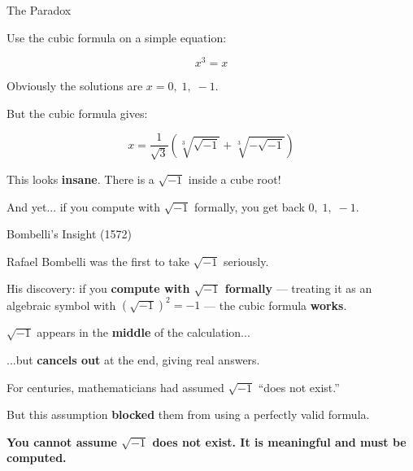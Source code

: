 \documentclass[10pt]{beamer}
\theoremstyle{definition}
\newcommand{\x}[1]{\alert{\textbf{#1}}}
\begin{document}
\begin{frame}{The Paradox}

Use the cubic formula on a simple equation:

$$x^3 = x$$

\vfill

Obviously the solutions are $x = 0, \; 1, \; -1$.

\vfill\pause

But the cubic formula gives:

$$x = \frac{1}{\sqrt{3}}\left(\sqrt[3]{\sqrt{-1}} + \sqrt[3]{-\sqrt{-1}}\right)$$

\vfill\pause

This looks \x{insane}. There is a $\sqrt{-1}$ inside a cube root!

\vfill

And yet... if you compute with $\sqrt{-1}$ formally, you get back $0, \; 1, \; -1$.

\end{frame}


\begin{frame}{Bombelli's Insight (1572)}

Rafael Bombelli was the first to take $\sqrt{-1}$ seriously.

\vfill

His discovery: if you \x{compute with $\sqrt{-1}$ formally} --- treating it as an algebraic symbol with $(\sqrt{-1})^2 = -1$ --- the cubic formula \x{works}.

\vfill\pause

$\sqrt{-1}$ appears in the \x{middle} of the calculation...

\vfill

...but \x{cancels out} at the end, giving real answers.

\vfill\pause

For centuries, mathematicians had assumed $\sqrt{-1}$ ``does not exist.''

\vfill

But this assumption \x{blocked} them from using a perfectly valid formula.

\vfill

\x{You cannot assume $\sqrt{-1}$ does not exist. It is meaningful and must be computed.}

\end{frame}
\end{document}
